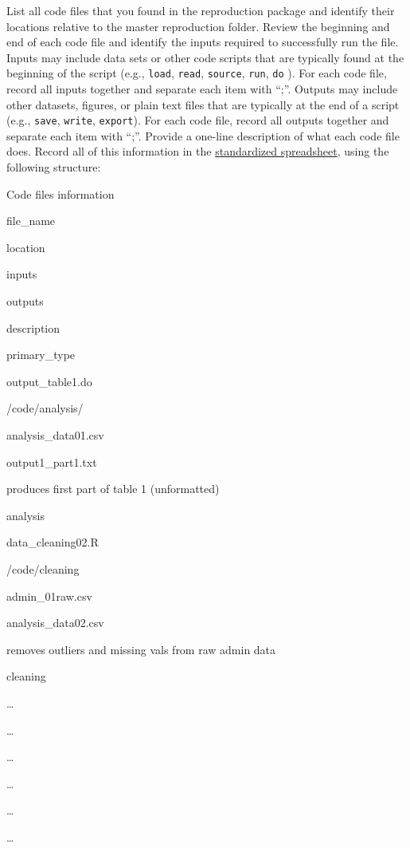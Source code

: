 \documentclass[]{book}
\begin{document}
List all code files that you found in the reproduction package and identify their locations relative to the master reproduction folder. Review the beginning and end of each code file and identify the inputs required to successfully run the file. Inputs may include data sets or other code scripts that are typically found at the beginning of the script (e.g., \texttt{load}, \texttt{read}, \texttt{source}, \texttt{run}, \texttt{do} ). For each code file, record all inputs together and separate each item with ``;''. Outputs may include other datasets, figures, or plain text files that are typically at the end of a script (e.g., \texttt{save}, \texttt{write}, \texttt{export}). For each code file, record all outputs together and separate each item with ``;''. Provide a one-line description of what each code file does. Record all of this information in the \href{https://docs.google.com/spreadsheets/d/1LUIdVFH0OfR70C7z07TYeE-uWzKI_JIeWUMaYhqEKK0/edit\#gid=1617799822\&range=A1}{standardized spreadsheet}, using the following structure:

\label{tab:code-files-information}Code files information

file\_name

location

inputs

outputs

description

primary\_type

output\_table1.do

/code/analysis/

analysis\_data01.csv

output1\_part1.txt

produces first part of table 1 (unformatted)

analysis

data\_cleaning02.R

/code/cleaning

admin\_01raw.csv

analysis\_data02.csv

removes outliers and missing vals from raw admin data

cleaning

\ldots{}

\ldots{}

\ldots{}

\ldots{}

\ldots{}

\ldots{}
\end{document}
